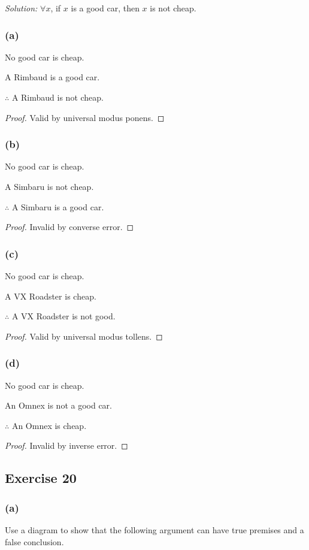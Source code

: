 \documentclass[14pt]{extarticle}
\newcommand{\fa}{\forall}
\begin{document}
{\it Solution:} $\fa x$, if $x$ is a good car, then $x$ is not cheap.

\subsubsection{(a)}
No good car is cheap.

A Rimbaud is a good car.

$\therefore$ A Rimbaud is not cheap.

\begin{proof}
Valid by universal modus ponens.
\end{proof}

\subsubsection{(b)}
No good car is cheap.

A Simbaru is not cheap.

$\therefore$ A Simbaru is a good car.

\begin{proof}
Invalid by converse error.
\end{proof}

\subsubsection{(c)}
No good car is cheap.

A VX Roadster is cheap.

$\therefore$ A VX Roadster is not good.

\begin{proof}
Valid by universal modus tollens.
\end{proof}

\subsubsection{(d)}
No good car is cheap.

An Omnex is not a good car.

$\therefore$ An Omnex is cheap.

\begin{proof}
Invalid by inverse error.
\end{proof}

\subsection{Exercise 20}

\subsubsection{(a)}
Use a diagram to show that the following argument can have true premises and a false conclusion.
\end{document}
